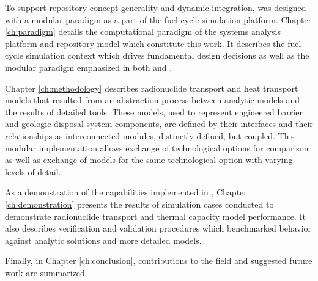 To support repository concept generality and dynamic integration, \Cyder was 
designed with a modular paradigm as a part of the \Cyclus fuel cycle simulation 
platform. Chapter \ref{ch:paradigm} details the computational paradigm of the 
\Cyclus systems analysis platform and \Cyder repository model which constitute 
this work.  It describes the \Cyclus fuel cycle simulation context which drives 
fundamental \Cyder design decisions as well as the modular paradigm emphasized 
in both \Cyclus and \Cyder. 

Chapter \ref{ch:methodology} describes radionuclide transport and heat transport 
models that resulted from an abstraction process between analytic models and the results 
of detailed tools.  These models, used to represent engineered barrier and geologic 
disposal system components, are defined by their interfaces and their 
relationships as interconnected modules, distinctly defined, but coupled.  This 
modular implementation allows exchange  of technological options for comparison 
as well as exchange of models for the same technological option with varying 
levels of detail.  

As a demonstration of the capabilities implemented in \Cyder, Chapter 
\ref{ch:demonstration} presents the results of simulation cases conducted to 
demonstrate radionuclide transport and thermal capacity model performance. It 
also describes verification and validation procedures which benchmarked \Cyder 
behavior against analytic solutions and more detailed models.  

Finally, in Chapter \ref{ch:conclusion}, contributions to the field and 
suggested future work are summarized. 




